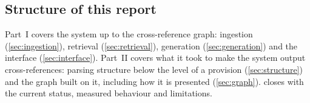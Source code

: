 \subsection{Structure of this report}

Part~I covers the system up to the cross-reference graph: ingestion
(\cref{sec:ingestion}), retrieval (\cref{sec:retrieval}), generation
(\cref{sec:generation}) and the interface (\cref{sec:interface}). Part~II
covers what it took to make the system output cross-references: parsing
structure below the level of a provision (\cref{sec:structure}) and the graph
built on it, including how it is presented (\cref{sec:graph}).
 closes with the current status, measured behaviour and
limitations.
